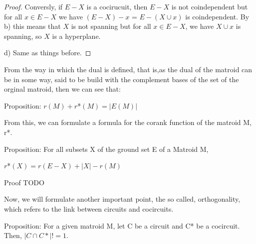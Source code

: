 \begin{proof}
    Conversly, if $E - X$ is a cocirucuit, then $E-X$ is not coindependent but for all $x \in E - X$ we have $(E - X) - x$ = $E - (X \cup x)$ is coindependent. By b) this means that $X$ is not spanning but for all $x \in E-X$, we have $X \cup x$ is spanning, so $X$ is a hyperplane.

    d) Same as things before.
    
\end{proof}


From the way in which the dual is defined, that is,as the dual of the matroid can be in some way, said to be build with the complement bases of the set of the orginal matroid, then we can see that:


Proposition: 
$r(M) + r$*$(M) = |E(M)|$

From this, we can formulate a formula for the corank function of the matroid M, r*. 


Proposition: For all subsets X of the ground set E of a Matroid M,

$r$*$(X)=r(E-X)+|X|-r(M)$

Proof TODO

Now, we will formulate another important point, the so called, orthogonality, which refers to the link between circuits and cocircuits. 

Proposition: For a given matroid M, let C be a circuit and C* be a cocircuit. Then,  
$|C \cap C*| != 1$.

